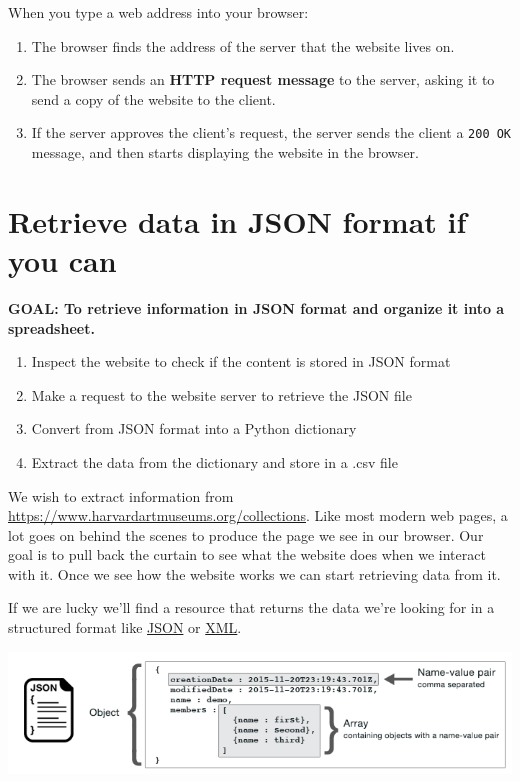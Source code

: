 \documentclass[]{book}
\providecommand{\tightlist}{%
  \setlength{\itemsep}{0pt}\setlength{\parskip}{0pt}}
\begin{document}
When you type a web address into your browser:

\begin{enumerate}
\def\labelenumi{\arabic{enumi}.}
\tightlist
\item
  The browser finds the address of the server that the website lives on.
\item
  The browser sends an \textbf{HTTP request message} to the server, asking it to send a copy of the website to the client.
\item
  If the server approves the client's request, the server sends the client a \texttt{200\ OK} message, and then starts displaying the website in the browser.
\end{enumerate}

\hypertarget{retrieve-data-in-json-format-if-you-can}{%
\section{Retrieve data in JSON format if you can}\label{retrieve-data-in-json-format-if-you-can}}

\textbf{GOAL: To retrieve information in JSON format and organize it into a spreadsheet.}

\begin{enumerate}
\def\labelenumi{\arabic{enumi}.}
\tightlist
\item
  Inspect the website to check if the content is stored in JSON format
\item
  Make a request to the website server to retrieve the JSON file
\item
  Convert from JSON format into a Python dictionary
\item
  Extract the data from the dictionary and store in a .csv file
\end{enumerate}

We wish to extract information from \url{https://www.harvardartmuseums.org/collections}. Like most modern web pages, a lot goes on behind the scenes to produce the page we see in our browser. Our goal is to pull back the curtain to see what the website does when we interact with it. Once we see how the website works we can start retrieving data from it.

If we are lucky we'll find a resource that returns the data we're looking for in a structured format like \href{https://json.org/}{JSON} or \href{https://en.wikipedia.org/wiki/XML}{XML}.

\includegraphics{Python/PythonWebScrape/images/json-format.png}
\end{document}
